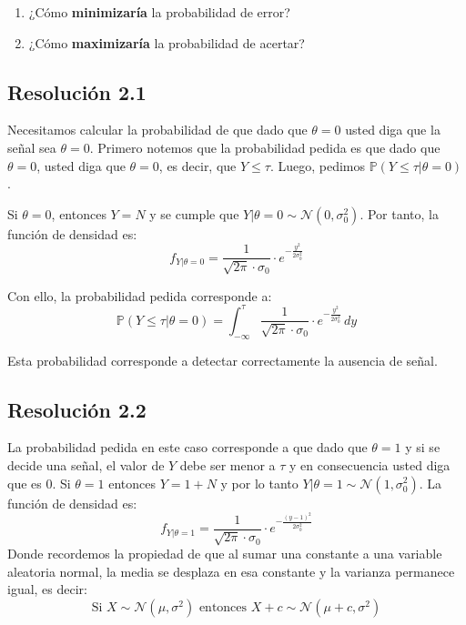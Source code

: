 \documentclass[
  11pt,
  letterpaper,
   addpoints,
  answers
  ]{exam}
\begin{document}
\begin{questions}
\begin{enumerate}
    \item ¿Cómo \textbf{minimizaría} la probabilidad de error?
    
    \item ¿Cómo \textbf{maximizaría} la probabilidad de acertar?
\end{enumerate}
\begin{solution}
  \subsection*{Resolución 2.1}
  
  Necesitamos calcular la probabilidad de que dado que $\theta = 0$ usted diga que la señal sea $\theta = 0$. Primero notemos que la probabilidad pedida es que dado que $\theta = 0$, usted diga que $\theta = 0$, es decir, que $Y \leq \tau$. Luego, pedimos $\mathbb{P}(Y \leq \tau | \theta = 0)$. 
  
  Si $\theta = 0$, entonces $Y = N$ y se cumple que $Y|\theta = 0 \sim \mathcal{N}(0, \sigma_0^2)$. Por tanto, la función de densidad es:
  \begin{equation}
  f_{Y|\theta=0} = \frac{1}{\sqrt{2\pi} \cdot \sigma_0} \cdot e^{-\frac{y^2}{2\sigma_0^2}}
  \end{equation}
  
  Con ello, la probabilidad pedida corresponde a:
  \begin{equation}
  \mathbb{P}(Y \leq \tau | \theta = 0) = \int_{-\infty}^{\tau} \frac{1}{\sqrt{2\pi} \cdot \sigma_0} \cdot e^{-\frac{y^2}{2\sigma_0^2}} \, dy
  \end{equation}
  
  Esta probabilidad corresponde a detectar correctamente la ausencia de señal.

  \subsection*{Resolución 2.2}
  
  La probabilidad pedida en este caso corresponde a que dado que $\theta = 1$ y si se decide una señal, el valor de $Y$ debe ser menor a $\tau$ y en consecuencia usted diga que es 0. Si $\theta = 1$ entonces $Y = 1 + N$ y por lo tanto $Y|\theta = 1 \sim \mathcal{N}(1, \sigma_0^2)$. La función de densidad es:
  \begin{equation}
  f_{Y|\theta=1} = \frac{1}{\sqrt{2\pi} \cdot \sigma_0} \cdot e^{-\frac{(y-1)^2}{2\sigma_0^2}}
  \end{equation}
  Donde recordemos la propiedad de que al sumar una constante a una variable aleatoria normal, la media se desplaza en esa constante y la varianza permanece igual, es decir:
  \begin{equation}
  \text{Si } X \sim \mathcal{N}(\mu, \sigma^2) \text{ entonces } X + c \sim \mathcal{N}(\mu + c, \sigma^2)
  \end{equation}


\end{solution}
\end{questions}
\end{document}
